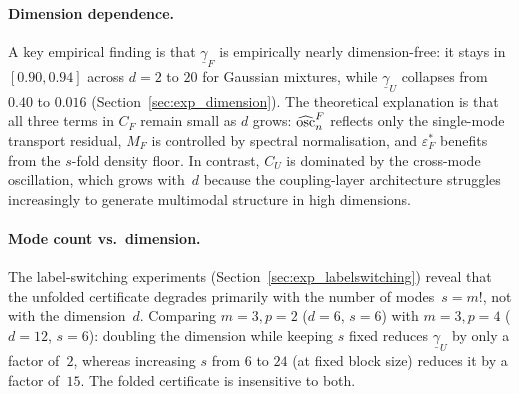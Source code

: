 \paragraph{Dimension dependence.}
A key empirical finding is that $\underline{\gamma}_F$ is
empirically nearly dimension-free: it stays in $[0.90, 0.94]$
across $d = 2$ to $20$ for Gaussian mixtures, while
$\underline{\gamma}_U$ collapses from $0.40$ to $0.016$
(Section~\ref{sec:exp_dimension}).  The theoretical explanation is that all three terms in $C_F$ remain
small as $d$ grows: $\widehat{\mathrm{osc}}_n^F$ reflects only the
single-mode transport residual, $M_F$ is controlled by spectral
normalisation, and $\varepsilon_F^*$ benefits from the $s$-fold
density floor.  In contrast, $C_U$ is dominated by the cross-mode
oscillation, which grows with~$d$ because the coupling-layer
architecture struggles increasingly to generate multimodal
structure in high dimensions.

\paragraph{Mode count vs.\ dimension.}
The label-switching experiments (Section~\ref{sec:exp_labelswitching})
reveal that the unfolded certificate degrades primarily with the
number of modes~$s = m!$, not with the dimension~$d$.
Comparing $m = 3, p = 2$ ($d = 6$, $s = 6$) with $m = 3, p = 4$
($d = 12$, $s = 6$): doubling the dimension while keeping $s$
fixed reduces $\underline{\gamma}_U$ by only a factor of~$2$,
whereas increasing $s$ from $6$ to $24$ (at fixed block size)
reduces it by a factor of~$15$.  The folded certificate is
insensitive to both.
